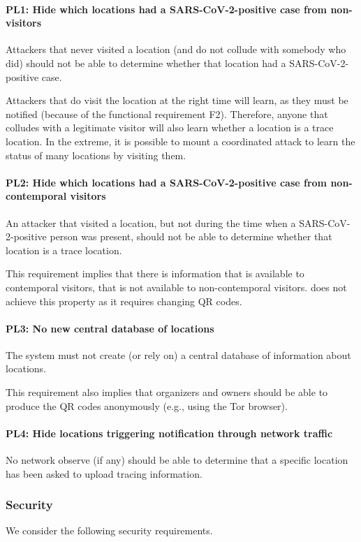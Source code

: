\paragraph{PL1: Hide which locations had a SARS-CoV-2-positive case from non-visitors} Attackers that never visited a location (and do not collude with somebody who did) should not be able to determine whether that location had a SARS-CoV-2-positive case.

Attackers that do visit the location at the right time will learn, as they must be notified (because of the functional requirement F2). Therefore, anyone that colludes with a legitimate visitor will also learn whether a location is a trace location. In the extreme, it is possible to mount a coordinated attack to learn the status of many locations by visiting them.

\paragraph{PL2: Hide which locations had a SARS-CoV-2-positive case from non-contemporal visitors} An attacker that visited a location, but not during the time when a SARS-CoV-2-positive person was present, should not be able to determine whether that location is a trace location.

This requirement implies that there is information that is available to contemporal visitors, that is not available to non-contemporal visitors. \name does not achieve this property as it requires changing QR codes.

\paragraph{PL3: No new central database of locations} The system must not create (or rely on) a central database of information about locations.

 This requirement also implies that organizers and owners should be able to produce the QR codes anonymously (e.g., using the Tor browser). 

\paragraph{PL4: Hide locations triggering notification through network traffic}
No network observe (if any) should be able to determine that a specific location has been asked to upload tracing information.

\subsubsection{Security}
We consider the following security requirements.

